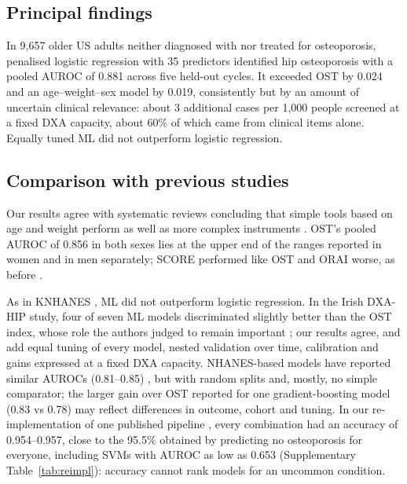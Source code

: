 \documentclass[11pt,a4paper]{article}
\begin{document}
\subsection{Principal findings}
In 9,657 older US adults neither diagnosed with nor treated for osteoporosis, penalised logistic regression with 35 predictors identified hip osteoporosis with a pooled AUROC of 0.881 across five held-out cycles. It exceeded OST by 0.024 and an age--weight--sex model by 0.019, consistently but by an amount of uncertain clinical relevance: about 3 additional cases per 1,000 people screened at a fixed DXA capacity, about 60\% of which came from clinical items alone. Equally tuned ML did not outperform logistic regression.

\subsection{Comparison with previous studies}
Our results agree with systematic reviews concluding that simple tools based on age and weight perform as well as more complex instruments \cite{rubin2013,nayak2015}. OST's pooled AUROC of 0.856 in both sexes lies at the upper end of the ranges reported in women \cite{geusens2002,rud2007,gourlay2008} and in men \cite{adler2003,lynn2008,diem2017} separately; SCORE performed like OST and ORAI worse, as before \cite{gourlay2008}.

As in KNHANES \cite{shim2020}, ML did not outperform logistic regression. In the Irish DXA-HIP study, four of seven ML models discriminated slightly better than the OST index, whose role the authors judged to remain important \cite{e2021}; our results agree, and add equal tuning of every model, nested validation over time, calibration and gains expressed at a fixed DXA capacity. NHANES-based models have reported similar AUROCs (0.81--0.85) \cite{tang2023,zhangy2025,zhang2025}, but with random splits and, mostly, no simple comparator; the larger gain over OST reported for one gradient-boosting model (0.83 vs 0.78) \cite{zhangy2025} may reflect differences in outcome, cohort and tuning. In our re-implementation of one published pipeline \cite{zhang2025}, every combination had an accuracy of 0.954--0.957, close to the 95.5\% obtained by predicting no osteoporosis for everyone, including SVMs with AUROC as low as 0.653 (Supplementary Table~\ref{tab:reimpl}): accuracy cannot rank models for an uncommon condition.
\end{document}
